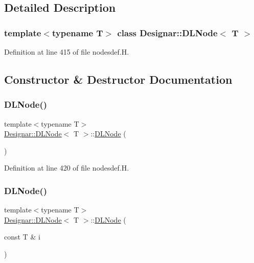 \subsection{Detailed Description}
\subsubsection*{template$<$typename T$>$\newline
class Designar\+::\+D\+L\+Node$<$ T $>$}



Definition at line 415 of file nodesdef.\+H.



\subsection{Constructor \& Destructor Documentation}
\mbox{\label{class_designar_1_1_d_l_node_aac2adda6b4d737b47d461efe02401f01}} 
\subsubsection{\texorpdfstring{D\+L\+Node()}{DLNode()}\hspace{0.1cm}{\footnotesize\ttfamily [1/5]}}
{\footnotesize\ttfamily template$<$typename T$>$ \\
\hyperlink{class_designar_1_1_d_l_node}{Designar\+::\+D\+L\+Node}$<$ T $>$\+::\hyperlink{class_designar_1_1_d_l_node}{D\+L\+Node} (\begin{DoxyParamCaption}{ }\end{DoxyParamCaption})\hspace{0.3cm}{\ttfamily [inline]}}



Definition at line 420 of file nodesdef.\+H.

\mbox{\label{class_designar_1_1_d_l_node_af55ccc85dacdef9932b36e1ebd681306}} 
\subsubsection{\texorpdfstring{D\+L\+Node()}{DLNode()}\hspace{0.1cm}{\footnotesize\ttfamily [2/5]}}
{\footnotesize\ttfamily template$<$typename T$>$ \\
\hyperlink{class_designar_1_1_d_l_node}{Designar\+::\+D\+L\+Node}$<$ T $>$\+::\hyperlink{class_designar_1_1_d_l_node}{D\+L\+Node} (\begin{DoxyParamCaption}\item[{const T \&}]{i }\end{DoxyParamCaption})\hspace{0.3cm}{\ttfamily [inline]}}



